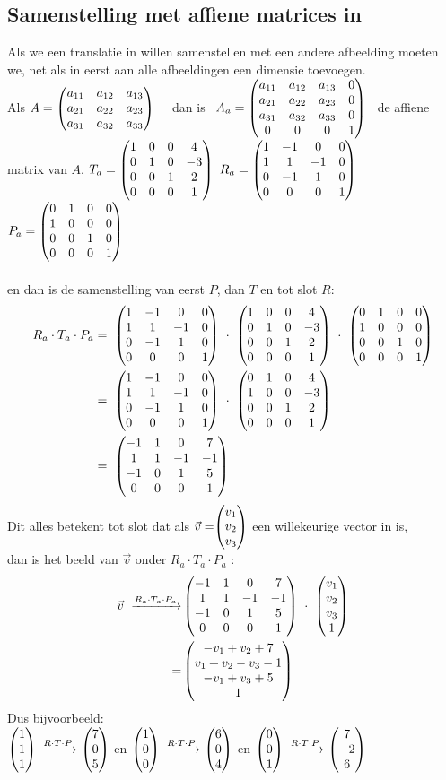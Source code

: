 \subsection{Samenstelling met affiene matrices in \RD}
Als we een translatie in \RD willen samenstellen met een andere afbeelding moeten we, net als in \RT eerst aan alle afbeeldingen een dimensie toevoegen. \\ 
 {
	Als $ 	A = \begin{pmatrix} {}a_{11} & a_{12} & a_{13}  \\  a_{21} & a_{22}  &  a_{23} \\  a_{31} & a_{32} & a_{33} \end{pmatrix} $ \ \ 
	dan is \ 
	$  
	A_a = \begin{pmatrix} a_{11} & a_{12} & a_{13} & 0  \\  a_{21} & a_{22}  & a_{23} & 0  \\  a_{31} & a_{32} & a_{33} & 0 \\ 0 & 0 & 0 & 1  \end{pmatrix}  $ \ de affiene matrix van $A$. } 
$ T_a = \begin{pmatrix}  1 & 0 & 0 & 4  \\  0 & 1 & 0 &-3  \\  0 & 0 & 1 & 2 \\ 0 & 0 & 0 & 1  \end{pmatrix} $  \qquad
$ R_a = \begin{pmatrix}  1 & -1 & 0 & 0  \\  1 & 1 & -1 & 0 \\  0 & -1 & 1  & 0 \\ 0 & 0 & 0 & 1  \end{pmatrix} $ \qquad
$ P_a = \begin{pmatrix}  0 & 1 & 0  & 0  \\  1 & 0 & 0 & 0  \\  0 & 0 & 1  & 0  \\ 0 & 0 & 0 & 1  \end{pmatrix} $ \\ \\
en dan is de samenstelling van eerst $P$, dan $T$ en tot slot $R$:
\begin{align*} 
R_a \cdot  T_a \cdot  P_a & = \ 
\matvier{ 1 & -1 & 0 & 0 }
{ 1 & 1 & -1 & 0}
{ 0 & -1 & 1  & 0}
{0 & 0 & 0 & 1 }  \ \cdot  \ 
\matvier{ 1 & 0 & 0 & 4 }
{ 0 & 1 & 0 &-3 }
{ 0 & 0 & 1 & 2}
{0 & 0 & 0 & 1 }  \ \cdot  \ 
\matvier{ 0 & 1 & 0  & 0 }  
{ 1 & 0 & 0 & 0 }
{ 0 & 0 & 1  & 0 } 
{0 & 0 & 0 & 1 }  \\
& = \ \matvier { 1 & -1 & 0 & 0 }
{ 1 & 1 & -1 & 0}
{ 0 & -1 & 1  & 0}
{0 & 0 & 0 & 1 }  \ \cdot  \ 
\matvier{ 0 & 1 & 0 & 4 }
{ 1 & 0 & 0 &-3 }
{ 0 & 0 & 1 & 2}
{0 & 0 & 0 & 1 }   \\
& = \ \matvier{ -1 & 1 & 0 & 7 }
{ 1 & 1 & -1 & -1 }
{ -1 & 0 & 1 & 5}
{0 & 0 & 0 & 1 }  
\end{align*} 
Dit alles betekent tot slot dat als $\vec{v} = \vecdriesnel{v} $ een willekeurige vector in \RD is, \\dan is  het beeld van $ \vec{v} $ onder $  R_a \cdot  T_a \cdot  P_a $ :
\begin{align*} 
\vec{v}  \  \xrightarrow{R_a \cdot  T_a \cdot  P_a}   
&   \matvier{ -1 & 1 & 0 & 7 }
{ 1 & 1 & -1 & -1 }
{ -1 & 0 & 1 & 5}
{0 & 0 & 0 & 1 }  \ \cdot  \ 
\matvier{v_1}{v_2}{v_3}{1}  \\ 
=  & \matvier {-v_1+v_2+7} 
{ v_1+v_2-v_3 -1 }
{-v_1+v_3+ 5} {1} 
\end{align*}                        
Dus bijvoorbeeld: \\
$ \vecdrie{1}{1}{1}  \  \xrightarrow{R\cdot  T\cdot  P} \  \vecdrie{7}{0}{5}    $ \quad en  \quad 
$ \vecdrie{1}{0}{0}  \  \xrightarrow{R\cdot T\cdot P}  \ \vecdrie{6}{0}{4}  $ 
\quad en  \quad 
$ \vecdrie{0}{0}{1}  \  \xrightarrow{R\cdot T\cdot P}  \ \vecdrie{7}{-2}{6}  $ 


